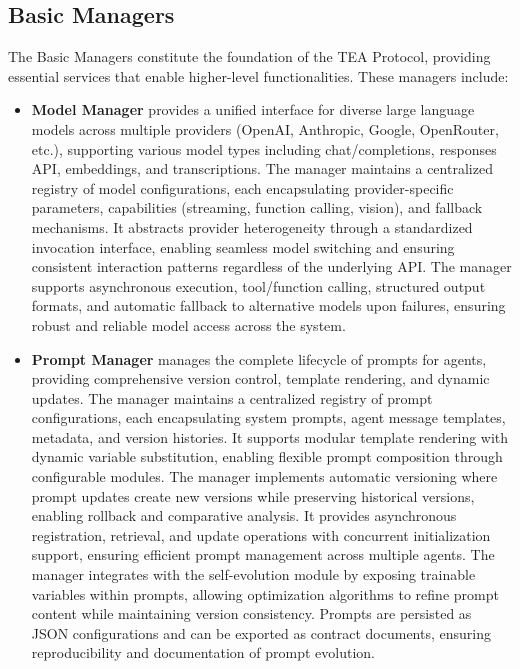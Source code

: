 \documentclass[11pt]{article}
\begin{document}
\subsection{Basic Managers}
The Basic Managers constitute the foundation of the TEA Protocol, providing essential services that enable higher-level functionalities. These managers include:
\begin{itemize}[leftmargin=*,itemsep=0.1em]
\item \textbf{Model Manager} provides a unified interface for diverse large language models across multiple providers (OpenAI, Anthropic, Google, OpenRouter, etc.), supporting various model types including chat/completions, responses API, embeddings, and transcriptions. The manager maintains a centralized registry of model configurations, each encapsulating provider-specific parameters, capabilities (streaming, function calling, vision), and fallback mechanisms. It abstracts provider heterogeneity through a standardized invocation interface, enabling seamless model switching and ensuring consistent interaction patterns regardless of the underlying API. The manager supports asynchronous execution, tool/function calling, structured output formats, and automatic fallback to alternative models upon failures, ensuring robust and reliable model access across the system.
\item \textbf{Prompt Manager} manages the complete lifecycle of prompts for agents, providing comprehensive version control, template rendering, and dynamic updates. The manager maintains a centralized registry of prompt configurations, each encapsulating system prompts, agent message templates, metadata, and version histories. It supports modular template rendering with dynamic variable substitution, enabling flexible prompt composition through configurable modules. The manager implements automatic versioning where prompt updates create new versions while preserving historical versions, enabling rollback and comparative analysis. It provides asynchronous registration, retrieval, and update operations with concurrent initialization support, ensuring efficient prompt management across multiple agents. The manager integrates with the self-evolution module by exposing trainable variables within prompts, allowing optimization algorithms to refine prompt content while maintaining version consistency. Prompts are persisted as JSON configurations and can be exported as contract documents, ensuring reproducibility and documentation of prompt evolution.

\end{itemize}
\end{document}
